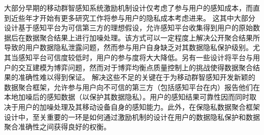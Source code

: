 	大部分早期的移动群智感知系统激励机制设计\cite{yang2012crowdsourcing,feng2014trac,Zhao,wen2015quality,zhang2015incentivize,zhang2015truthful,jin2015quality,duan2012incentive,Shibo14,peng2015pay,cheung2015distributed,he2017exchange,gong2017truthful}仅考虑了参与用户的感知成本，而直到近些年才开始有更多研究工作将参与用户的隐私成本考虑进来。
	这其中大部分设计基于感知平台为可信第三方的理想假设，允许感知平台收集得到用户的原始数据后在数据聚合结果上进行加噪处理\cite{jin2016inception,zhang2016privacy}。该方式可以一定程度上解决公开聚合结果所导致的用户数据隐私泄露问题，然而参与用户自身缺乏对其数据隐私保护级别。尤其当感知平台可信度较低时，用户的参与度将大大降低。另有一些设计将平台与用户的交互建模为博弈问题\cite{wang2016value,wang2016buying}，然而对于博弈均衡点质量控制上的挑战使得数据聚合结果的准确性难以得到保证。
	解决这些不足的关键在于为移动群智感知开发新颖的数据聚合框架，允许参与用户向不可信的第三方（包括感知平台在内）报告他们在本地加噪后的感知数据（以保护其数据隐私）。用户的感知结果可靠性因而同时取决于用户的加噪处理及其移动设备自身的感知能力\cite{jin2016inception}。此外，在保隐私数据聚合框架设计中，至关重要的一环是如何通过激励机制的设计在用户的数据隐私保护和数据聚合准确性之间获得良好的权衡。	
